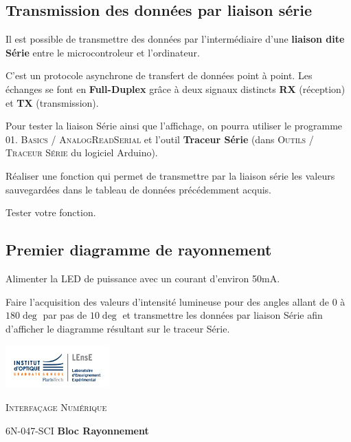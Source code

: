 \documentclass[a4paper,11pt,titlepage]{article} %
\begin{document}
\subsection{Transmission des données par liaison série}

Il est possible de transmettre des données par l'intermédiaire d'une \textbf{liaison dite Série} entre le microcontroleur et l'ordinateur.

C'est un protocole asynchrone de transfert de données point à point. Les échanges se font en \textbf{Full-Duplex} grâce à deux signaux distincts \textbf{RX} (réception) et \textbf{TX} (transmission).

\medskip

Pour tester la liaison Série ainsi que l'affichage, on pourra utiliser le programme \textsc{01. Basics / AnalogReadSerial} et l'outil \textbf{Traceur Série} (dans \textsc{Outils / Traceur Série} du logiciel Arduino).


\Manip Réaliser une fonction qui permet de transmettre par la liaison série les valeurs sauvegardées dans le tableau de données précédemment acquis.

\Manip Tester votre fonction.

\subsection{Premier diagramme de rayonnement}

\Manip Alimenter la LED de puissance avec un courant d'environ 50mA.

\Manip Faire l'acquisition des valeurs d'intensité lumineuse pour des angles allant de $0$ à $180\deg{}$ par pas de $10\deg{}$ et transmettre les données par liaison Série afin d'afficher le diagramme résultant sur le traceur Série.


\cleardoublepage
\strut %

\begin{minipage}[c]{.25\linewidth}
	\includegraphics[width=4cm]{images/Logo-LEnsE.png}
\end{minipage} \hfill
\begin{minipage}[c]{.4\linewidth}

\begin{center}
\vspace{0.3cm}
{\Large \textsc{Interfaçage Numérique}}

\medskip

6N-047-SCI \qquad \textbf{\large Bloc Rayonnement}

\end{center}
\end{minipage}\hfill
\end{document}
